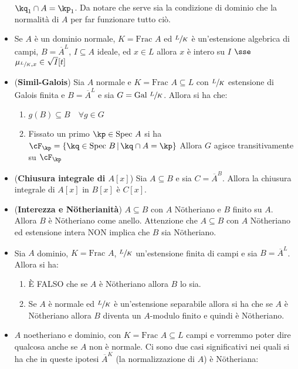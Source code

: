 \documentclass[a4paper,NoNotes,GeneralMath]{stdmdoc}
\newcommand{\pipe}{\,|\,}
\newcommand{\intclos}[2]{\ensuremath{\overline{#1}^{#2}}}
\newcommand{\Frac}{\text{Frac }}
\newcommand{\Spec}{\text{Spec }}
\newcommand{\Gal}{\text{Gal }}
\begin{document}
\begin{itemize}
  $\kq_1 \cap A = \kp_1$. \newline
  Da notare che serve sia la condizione di dominio che la normalità di
  $A$ per far funzionare tutto ciò.
\item Se $A$ è un dominio normale, $K = \Frac A$ ed $\sfrac{L}{K}$ è
  un'estensione algebrica di campi, $B = \intclos{A}{L}$,
  $I \subseteq A$ ideale, ed $x \in L$ allora $x$ è intero su $I$ $\sse$
  $\mu_{\sfrac{L}{K}, x} \in \sqrt{I}[t]$
\item ({\bf Simil-Galois}) Sia $A$ normale e $K = \Frac A \subseteq L$
  con $\sfrac{L}{K}$ estensione di Galois finita e $B = \intclos{A}{L}$
  e sia $G = \Gal \sfrac{L}{K}$. Allora si ha che:
  \begin{enumerate}
  \item $g(B) \subseteq B \quad \forall g \in G$
  \item Fissato un primo $\kp \in \Spec A$ si ha
    $\cF_\kp = \{ \kq \in \Spec B \pipe \kq \cap A = \kp \}$
    Allora $G$ agisce transitivamente su $\cF_\kp$
  \end{enumerate}
\item ({\bf Chiusura integrale di $A[x]$}) Sia $A \subseteq B$ e sia
  $C = \intclos{A}{B}$. Allora la chiusura integrale di $A[x]$ in $B[x]$
  è $C[x]$.
\item ({\bf Interezza e Nötherianità}) $A \subseteq B$ con $A$
  Nötheriano e $B$ finito su $A$. Allora $B$ è Nötheriano come
  anello. \newline
  Attenzione che $A \subseteq B$ con $A$ Nötheriano ed estensione intera
  NON implica che $B$ sia Nötheriano.
\item Sia $A$ dominio, $K = \Frac A$, $\sfrac{L}{K}$ un'estensione
  finita di campi e sia $B = \intclos{A}{L}$. Allora si ha:
  \begin{enumerate}
  \item È FALSO che se $A$ è Nötheriano allora $B$ lo sia.
  \item Se $A$ è normale ed $\sfrac{L}{K}$ è un'estensione separabile
    allora si ha che se $A$ è Nötheriano allora $B$ diventa un
    $A$-modulo finito e quindi è Nötheriano.
  \end{enumerate}
\item $A$ noetheriano e dominio, con $K = \Frac A \subseteq L$ campi e
  vorremmo poter dire qualcosa anche se $A$ non è normale. Ci sono due
  casi significativi nei quali si ha che in queste ipotesi
  $\intclos{A}{K}$ (la normalizzazione di $A$) è Nötheriana:
  \begin{enumerate}

\end{enumerate}
\end{itemize}
\end{document}
